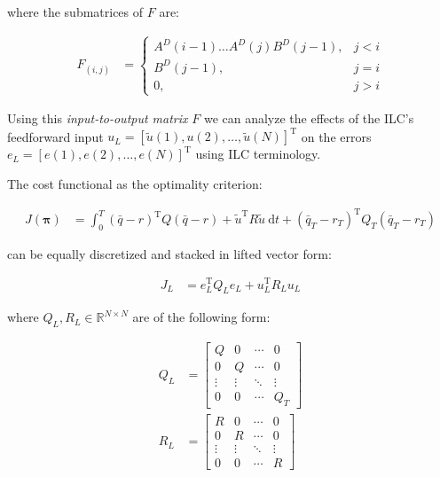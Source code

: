 \documentclass[10pt,a4paper]{article}
\newcommand{\joint}{q} %
\newcommand{\state}{\bar{\joint}} %
\newcommand{\error}{e} %
\newcommand{\traj}{r} %
\newcommand{\sysInput}{u} %
\newcommand{\linInput}{\tilde{u}} %
\newcommand{\policy}{\mathbf{\pi}}
\newcommand{\ValueFunction}{J}
\newcommand{\numSteps}{N} %
\begin{document}
where the submatrices of $F$ are:

\begin{equation*}
\begin{aligned}
F_{(i,j)} &= \left \{
\begin{array}{cc}
A^{D}(i-1)\ldots A^{D}(j)B^{D}(j-1), & j < i \\ 
B^{D}(j-1), & j = i \\
0, & j > i 
\end{array} \right.
\end{aligned}
\end{equation*}

Using this \emph{input-to-output matrix} $F$ we can analyze the effects of the ILC's feedforward input $\sysInput_L = [\linInput(1), \sysInput(2), \ldots, \linInput(\numSteps)]^{\mathrm{T}}$ on the errors $\error_L = [\error(1), \error(2),\ldots,\error(\numSteps)]^{\mathrm{T}}$ using ILC terminology.

The cost functional as the optimality criterion:

\begin{equation}
\begin{aligned}
\ValueFunction(\policy) &= \int_{0}^{T} (\state - \traj)^{\mathrm{T}}Q(\state - \traj) + \linInput^{\mathrm{T}}R\linInput \ \mathrm{d}t + (\state_T-\traj_T)^{\mathrm{T}}Q_{T}(\state_T-\traj_T)
\end{aligned}
\label{cost}
\end{equation}

can be equally discretized and stacked in lifted vector form:

\begin{equation}
\begin{aligned}
\ValueFunction_L &= \error_L^{\mathrm{T}}Q_L\error_L + \sysInput_L^{\mathrm{T}}R_L\sysInput_L
\end{aligned}
\label{costFunctional}
\end{equation}

where $Q_L, R_L \in \mathbb{R}^{N \times N}$ are of the following form:

\begin{equation*}
\begin{aligned}
 Q_L &= 
 \begin{bmatrix}
  Q & 0 & \cdots & 0 \\
  0 & Q & \cdots & 0 \\
  \vdots  & \vdots  & \ddots & \vdots  \\
  0 & 0 & \cdots & Q_T
 \end{bmatrix} \\
 R_L &= 
  \begin{bmatrix}
   R & 0 & \cdots & 0 \\
   0 & R & \cdots & 0 \\
   \vdots  & \vdots  & \ddots & \vdots  \\
   0 & 0 & \cdots & R
  \end{bmatrix}
\end{aligned}
\end{equation*}
\end{document}
